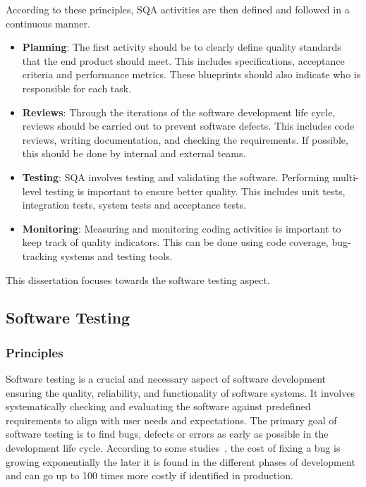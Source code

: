 According to these principles, SQA activities are then defined and followed in a continuous manner.
\begin{itemize}[label={}]
    \item \textbf{Planning}: The first activity should be to clearly define quality standards that the end product should meet. This includes specifications, acceptance criteria and performance metrics. These blueprints should also indicate who is responsible for each task.
    \item \textbf{Reviews}: Through the iterations of the software development life cycle, reviews should be carried out to prevent software defects. This includes code reviews, writing documentation, and checking the requirements. If possible, this should be done by internal and external teams.
    \item \textbf{Testing}: SQA involves testing and validating the software. Performing multi-level testing is important to ensure better quality. This includes unit tests, integration tests, system tests and acceptance tests.
    \item \textbf{Monitoring}: Measuring and monitoring coding activities is important to keep track of quality indicators. This can be done using code coverage, bug-tracking systems and testing tools.
\end{itemize}

This dissertation focuses towards the software testing aspect.


\subsection{Software Testing}

\subsubsection{Principles}

Software testing is a crucial and necessary aspect of software development ensuring the quality, reliability, and functionality of software systems. It involves systematically checking and evaluating the software against predefined requirements to align with user needs and expectations. The primary goal of software testing is to find bugs, defects or errors as early as possible in the development life cycle. According to some studies~\cite{costBug}, the cost of fixing a bug is growing exponentially the later it is found in the different phases of development and can go up to 100 times more costly if identified in production. \\

